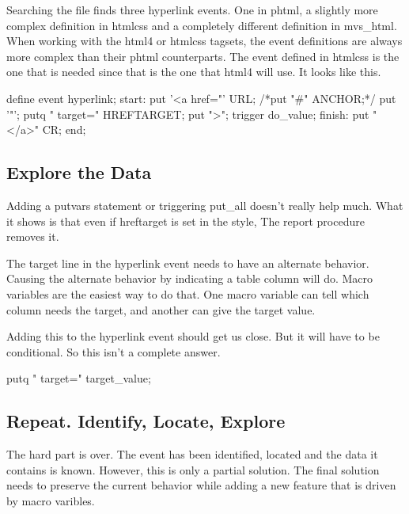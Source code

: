 Searching the file finds three hyperlink events.  One in phtml,
a slightly more complex definition in htmlcss and a completely different definition
in mvs\_html.  When working with the html4 or htmlcss tagsets, the event definitions
are always more complex than their phtml counterparts.
The event defined in htmlcss is the one that is needed since that is the one that html4 will
use.  It looks like this.

\begin{sfvcode}
        define event hyperlink;
          start:
            put '<a href="' URL;
            /*put "#" ANCHOR;*/
            put '"';
            putq " target=" HREFTARGET;
            put ">";
            trigger do_value;
          finish:
            put "</a>" CR;
        end;
\end{sfvcode}

\subsection{Explore the Data}
Adding a putvars statement or triggering put\_all doesn't really help much.  What
it shows is that even if hreftarget is set in the style, The report procedure
removes it.  

The target line in the hyperlink event needs to have an alternate behavior.  Causing
the alternate behavior by indicating a table column will do.
Macro variables are the easiest way to do
that.  One macro variable can tell which column needs the target, and another
can give the target value.   

\begin{sfvcode}
\end{sfvcode}
  

Adding this to the hyperlink event should get us close.  But it will have
to be conditional.  So this isn't a complete answer.
\begin{sfvcode}
        putq " target=" target_value;
\end{sfvcode}

\subsection{Repeat.  Identify, Locate, Explore} 
The hard part is over.  The event has been identified, located and the data
it contains is known.  However, this is only a partial solution.  The final
solution needs to preserve the current behavior while adding a new feature 
that is driven by macro varibles.

